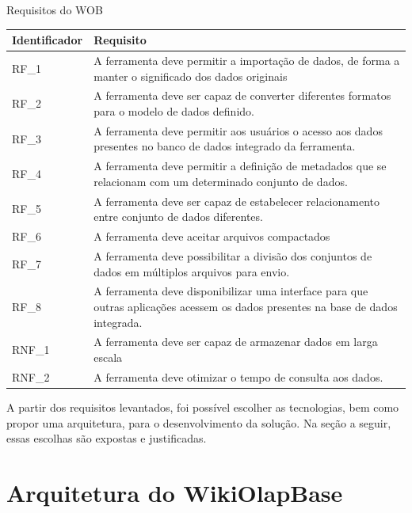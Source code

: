 \begin{quadro}[!htb]
    \centering
    \caption{Requisitos do WOB}
    \label{quadro:requisitos}
    \begin{tabular}{|p{2cm}|p{13cm}|}
        \hline
        Identificador   &   Requisito \\
        \hline
        RF\_1    &  A ferramenta deve permitir a importação de dados, de forma a manter o significado dos dados originais \\   
        \hline
        RF\_2    &  A ferramenta deve ser capaz de converter diferentes formatos para o modelo de dados definido. \\        
        \hline
        RF\_3    &  A ferramenta deve permitir aos usuários o acesso aos dados presentes no banco de dados integrado da ferramenta. \\
        \hline
        RF\_4    &  A ferramenta deve permitir a definição de metadados que se relacionam com um determinado conjunto de dados. \\
        \hline
        RF\_5    &  A ferramenta deve ser capaz de estabelecer relacionamento entre conjunto de dados diferentes. \\
        \hline
        RF\_6    &  A ferramenta deve aceitar arquivos compactados \\
        \hline
        RF\_7    &  A ferramenta deve possibilitar a divisão dos conjuntos de dados em múltiplos arquivos para envio. \\        
        \hline
        RF\_8    &  A ferramenta deve disponibilizar uma interface para que outras aplicações acessem os dados presentes na base de dados integrada. \\
        \hline
        RNF\_1    &  A ferramenta deve ser capaz de armazenar dados em larga escala \\
        \hline
        RNF\_2    &  A ferramenta deve otimizar o tempo de consulta aos dados. \\ 
        \hline   
    \end{tabular}
\end{quadro}

A partir dos requisitos levantados, foi possível escolher as tecnologias, bem como propor uma 
arquitetura, para o desenvolvimento da solução. Na seção a seguir, essas escolhas são expostas 
e justificadas.

\section{Arquitetura do WikiOlapBase}
\label{sec:arquitetura}

